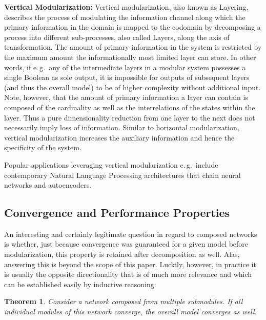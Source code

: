 \documentclass[conference]{IEEEtran}
\begin{document}
\textbf{Vertical Modularization:} Vertical modularization, also known as Layering, describes the process of modulating the information channel along which the primary information in the domain is mapped to the codomain by decomposing a process into different sub-processes, also called Layers, along the axis of transformation. The amount of primary information in the system is restricted by the maximum amount the informationally most limited layer can store. In other words, if e.\,g.\ any of the intermediate layers in a modular system possesses a single Boolean as sole output, it is impossible for outputs of subsequent layers (and thus the overall model) to be of higher complexity without additional input. Note, however, that the amount of primary information a layer can contain is composed of the cardinality as well as the interrelations of the states within the layer. Thus a pure dimensionality reduction from one layer to the next does not necessarily imply loss of information. Similar to horizontal modularization, vertical modularization increases the auxiliary information and hence the specificity of the system.

Popular applications leveraging vertical modularization e.\,g.\ include contemporary Natural Language Processing architectures that chain neural networks and autoencoders.
            
\subsection{Convergence and Performance Properties%
            \label{sec:compnet_convergence_performance}}

An interesting and certainly legitimate question in regard to composed networks is whether, just because convergence was guaranteed for a given model before modularization, this property is retained after decomposition as well. Alas, answering this is beyond the scope of this paper. Luckily, however, in practice it is usually the opposite directionality that is of much more relevance and which can be established easily by inductive reasoning:

\vspace{\baselineskip}
\newtheorem{theorem}{Theorem}
\begin{theorem}
    Consider a network composed from multiple submodules. If all individual modules of this network converge, the overall model converges as well.
\end{theorem}
\vspace{\baselineskip}
\end{document}
